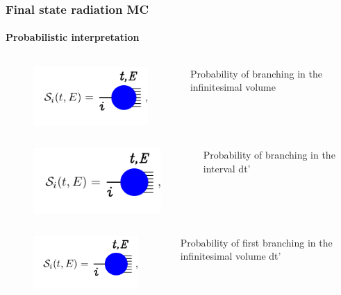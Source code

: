\documentclass[aspectratio=43]{beamer}
\begin{document}
\begin{frame}

	\frametitle{Final state radiation MC}
	\framesubtitle{Probabilistic interpretation}

	\begin{columns} 
	
		
		\begin{figure}
			\includegraphics[width = 2.5 cm]{plots/shower_1.png}
		\end{figure}
		
		
		\footnotesize Probability of branching in the infinitesimal volume

	\end{columns}

	\begin{columns} 
	
		\column{0.5\textwidth}
		
		\begin{figure}
			\includegraphics[width = 2.5 cm]{plots/shower_1.png}
		\end{figure}
		
		\column{0.5\textwidth}
		
		\footnotesize Probability of branching in the interval dt'

	\end{columns}

	\begin{columns} 
	
		
		\begin{figure}
			\includegraphics[width = 2.5 cm]{plots/shower_1.png}
		\end{figure}
		
		
		\footnotesize Probability of first branching in the infinitesimal volume dt'
	
	\end{columns}

\end{frame}
\end{document}
